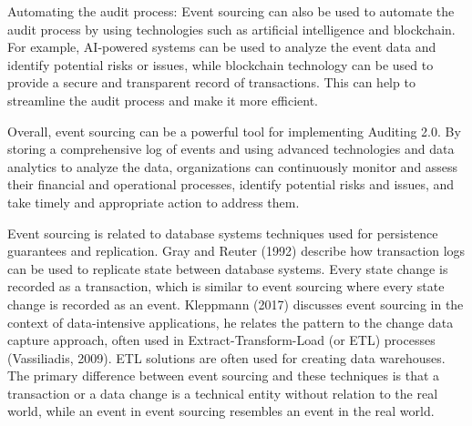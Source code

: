 Automating the audit process: Event sourcing can also be used to automate the audit process by using technologies such as artificial intelligence and blockchain. For example, AI-powered systems can be used to analyze the event data and identify potential risks or issues, while blockchain technology can be used to provide a secure and transparent record of transactions. This can help to streamline the audit process and make it more efficient.

Overall, event sourcing can be a powerful tool for implementing Auditing 2.0. By storing a comprehensive log of events and using advanced technologies and data analytics to analyze the data, organizations can continuously monitor and assess their financial and operational processes, identify potential risks and issues, and take timely and appropriate action to address them.

Event sourcing is related to database systems techniques used for persistence guarantees and replication. Gray and Reuter (1992) describe how transaction logs can be used to replicate state between database systems. Every state change is recorded as a transaction, which is similar to event sourcing where every state change is recorded as an event. Kleppmann (2017) discusses event sourcing in the context of data-intensive applications, he relates the pattern to the change data capture approach, often used in Extract-Transform-Load (or ETL) processes (Vassiliadis, 2009). ETL solutions are often used for creating data warehouses. The primary difference between event sourcing and these techniques is that a transaction or a data change is a technical entity without relation to the real world, while an event in event sourcing resembles an event in the real world.

